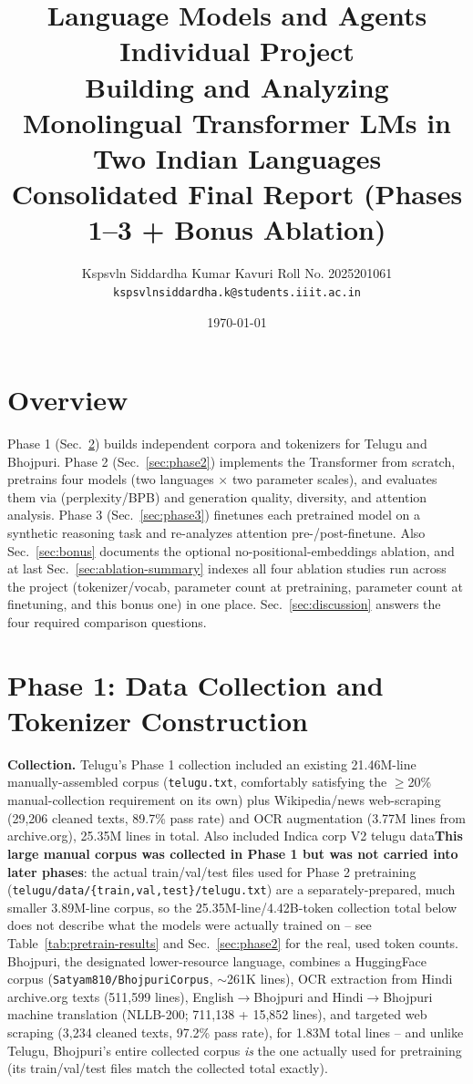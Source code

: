 \documentclass[10pt,a4paper]{article}
\title{\vspace{-1.3cm}\textbf{\large Language Models and Agents Individual Project}\\[2pt]
\textbf{\Large Building and Analyzing Monolingual Transformer LMs in Two Indian Languages}\\[2pt]
\normalsize Consolidated Final Report (Phases 1--3 + Bonus Ablation)}
\author{\small Kspsvln Siddardha Kumar Kavuri \quad Roll No. 2025201061 \quad \texttt{kspsvlnsiddardha.k@students.iiit.ac.in}}
\date{\small \today}
\begin{document}
\maketitle
\thispagestyle{fancy}
\vspace{-0.9cm}


\section{Overview}
\vspace{-2pt}
Phase 1 (Sec.~\ref{sec:phase1}) builds independent corpora and tokenizers for Telugu
and Bhojpuri. Phase 2 (Sec.~\ref{sec:phase2}) implements the Transformer from scratch, pretrains
four models (two languages $\times$ two parameter scales), and evaluates them via
(perplexity/BPB) and generation quality, diversity, and attention analysis. Phase 3
(Sec.~\ref{sec:phase3}) finetunes each pretrained model on a synthetic reasoning task and
re-analyzes attention pre-/post-finetune. Also Sec.~\ref{sec:bonus} documents the optional
no-positional-embeddings ablation, and at last Sec.~\ref{sec:ablation-summary} indexes all four ablation
studies run across the project (tokenizer/vocab, parameter count at pretraining, parameter count
at finetuning, and this bonus one) in one place. Sec.~\ref{sec:discussion} answers the four
required comparison questions.

\section{Phase 1: Data Collection and Tokenizer Construction}
\label{sec:phase1}
\vspace{-2pt}
\textbf{Collection.} Telugu's Phase 1 collection included an existing 21.46M-line
manually-assembled corpus (\texttt{telugu.txt}, comfortably satisfying the $\geq$20\% manual-collection
requirement on its own) plus Wikipedia/news web-scraping (29,206 cleaned texts, 89.7\% pass
rate) and OCR augmentation (3.77M lines from archive.org), 25.35M lines in total. Also included Indica corp V2 telugu data\textbf{This
large manual corpus was collected in Phase 1 but was not carried into later phases}: the actual
train/val/test files used for Phase 2 pretraining (\texttt{telugu/data/\{train,val,test\}/telugu.txt})
are a separately-prepared, much smaller 3.89M-line corpus, so the 25.35M-line/4.42B-token
collection total below does not describe what the models were actually trained on -- see
Table~\ref{tab:pretrain-results} and Sec.~\ref{sec:phase2} for the real, used token counts.
Bhojpuri, the designated lower-resource language, combines a HuggingFace corpus
(\texttt{Satyam810/BhojpuriCorpus}, $\sim$261K lines), OCR extraction from Hindi archive.org
texts (511,599 lines), English$\to$Bhojpuri and Hindi$\to$Bhojpuri machine translation
(NLLB-200; 711,138 + 15,852 lines), and targeted web scraping (3,234 cleaned texts, 97.2\% pass
rate), for 1.83M total lines -- and unlike Telugu, Bhojpuri's entire collected corpus \emph{is}
the one actually used for pretraining (its train/val/test files match the collected total
exactly).
\end{document}

